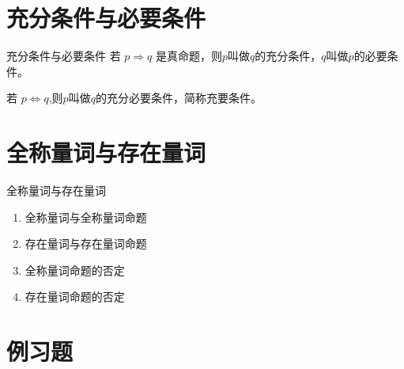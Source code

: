 \documentclass[10pt,
	aspectratio=169,%
	hyperref={colorlinks,
		citecolor=peking_blue,
		urlcolor=peking_blue,
		linkcolor=},
	t,%
	]{beamer}
\theoremstyle{plain}
\newtheorem{proposition}{Proposition}
\begin{document}
\section{充分条件与必要条件}

\begin{frame}{充分条件与必要条件}
	若 $p \Rightarrow q$ 是真命题，则$p$叫做$q$的充分条件，$q$叫做$p$的必要条件。
	
	若 $p \Leftrightarrow q$,则$p$叫做$q$的充分必要条件，简称充要条件。
%
%

\end{frame}



\section{全称量词与存在量词}

\begin{frame}{全称量词与存在量词}

\begin{enumerate}
	\item 全称量词与全称量词命题
	\item 存在量词与存在量词命题
	\item 全称量词命题的否定
	\item 存在量词命题的否定
\end{enumerate}
%
%
    
\end{frame}

\section{例习题}
\end{document}
